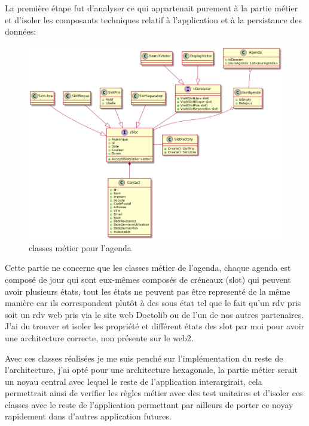 La première étape fut d'analyser ce qui appartenait purement à la partie métier et d'isoler les composants 
techniques relatif à l'application et à la persistance des données: \newline

\begin{figure}[h]
	\centering
	\includegraphics[width=1\linewidth]{Images/slotmodelold}
	\caption{classes métier pour l'agenda}
	\label{fig:domainagenda}
\end{figure}

Cette partie ne concerne que les classes métier de l'agenda, chaque agenda est composé de jour 
qui sont eux-mêmes composés de créneaux (slot) qui peuvent avoir plusieurs états, tout les 
états ne peuvent pas être representé de la même manière car ils correspondent plutôt à 
des sous état tel que le fait qu'un rdv pris soit un rdv web pris via le site web Doctolib 
ou de l'un de nos autres partenaires. 
J'ai du trouver et isoler les propriété et différent états des slot par moi pour avoir une 
architecture correcte, non présente sur le web2.  \newline

Avec ces classes réalisées je me suis penché sur l'implémentation du reste de l'architecture, 
j'ai opté pour une architecture hexagonale, la partie métier serait un noyau central avec 
lequel le reste de l'application interargirait, cela permettrait ainsi de 
verifier les règles métier avec des test unitaires et d'isoler ces classes avec le reste 
de l'application permettant par ailleurs de porter ce noyay rapidement dans 
d'autres application futures.


